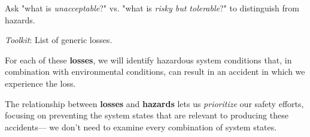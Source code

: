 \documentclass[a4paper]{tufte-book}
\begin{document}
\begin{landscape}
\begin{multicols}{2}

Ask "what is \emph{unacceptable}?" vs. "what is \emph{risky but tolerable}?" to distinguish from hazards.

\emph{Toolkit}: List of generic losses.


For each of these \textbf{losses}, we will identify hazardous system conditions that, in combination with environmental conditions, can result in an accident in which we experience the loss.

The relationship between \textbf{losses} and \textbf{hazards} lets us \emph{prioritize} our safety efforts, focusing on preventing the system states that are relevant to producing these accidents--- we don't need to examine every combination of system states.

\end{multicols}
\end{landscape}
\end{document}
